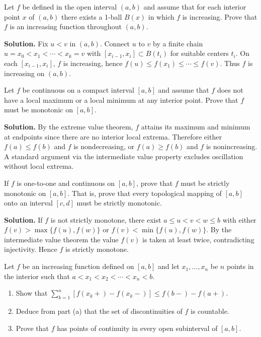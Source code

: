 \begin{problembox}
Let $f$ be defined in the open interval $(a, b)$ and assume that for each interior point $x$ of $(a, b)$ there exists a 1-ball $B(x)$ in which $f$ is increasing. Prove that $f$ is an increasing function throughout $(a, b)$.
\end{problembox}

\noindent\textbf{Solution.}
Fix $u<v$ in $(a,b)$. Connect $u$ to $v$ by a finite chain $u=x_0<x_1<\cdots<x_k=v$ with $[x_{i-1},x_i]\subset B(t_i)$ for suitable centers $t_i$. On each $[x_{i-1},x_i]$, $f$ is increasing, hence $f(u)\le f(x_1)\le\cdots\le f(v)$. Thus $f$ is increasing on $(a,b)$.
\medskip

\begin{problembox}
Let $f$ be continuous on a compact interval $[a, b]$ and assume that $f$ does not have a local maximum or a local minimum at any interior point. Prove that $f$ must be monotonic on $[a, b]$.
\end{problembox}

\noindent\textbf{Solution.}
By the extreme value theorem, $f$ attains its maximum and minimum at endpoints since there are no interior local extrema. Therefore either $f(a)\le f(b)$ and $f$ is nondecreasing, or $f(a)\ge f(b)$ and $f$ is nonincreasing. A standard argument via the intermediate value property excludes oscillation without local extrema.
\medskip

\begin{problembox}
If $f$ is one-to-one and continuous on $[a, b]$, prove that $f$ must be strictly monotonic on $[a, b]$. That is, prove that every topological mapping of $[a, b]$ onto an interval $[c, d]$ must be strictly monotonic.
\end{problembox}

\noindent\textbf{Solution.}
If $f$ is not strictly monotone, there exist $a\le u<v<w\le b$ with either $f(v)>\max\{f(u),f(w)\}$ or $f(v)<\min\{f(u),f(w)\}$. By the intermediate value theorem the value $f(v)$ is taken at least twice, contradicting injectivity. Hence $f$ is strictly monotone.
\medskip

\begin{problembox}
Let $f$ be an increasing function defined on $[a, b]$ and let $x_1, \ldots, x_n$ be $n$ points in the interior such that $a < x_1 < x_2 < \cdots < x_n < b$.
\begin{enumerate}[label=(\alph*)]
\item Show that $\sum_{k=1}^n [f(x_k+) - f(x_k-)] \leq f(b-) - f(a+)$.
\item Deduce from part (a) that the set of discontinuities of $f$ is countable.
\item Prove that $f$ has points of continuity in every open subinterval of $[a, b]$.
\end{enumerate}
\end{problembox}

